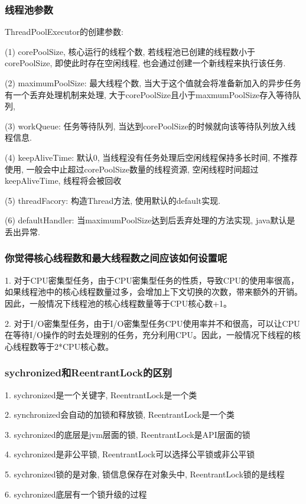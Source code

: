 \subsubsection{线程池参数}
ThreadPoolExecutor的创建参数: \par
(1) corePoolSize, 核心运行的线程个数, 若线程池已创建的线程数小于corePoolSize, 即使此时存在空闲线程, 也会通过创建一个新线程来执行该任务. \par
(2) maximumPoolSize: 最大线程个数, 当大于这个值就会将准备新加入的异步任务有一个丢弃处理机制来处理, 大于corePoolSize且小于maxmumPoolSize存入等待队列,\par
(3) workQueue: 任务等待队列, 当达到corePoolSize的时候就向该等待队列放入线程信息.\par
(4) keepAliveTime: 默认0, 当线程没有任务处理后空闲线程保持多长时间, 不推荐使用, 一般会中止超过corePoolSize数量的线程资源, 空闲线程时间超过keepAliveTime, 线程将会被回收 \par
(5) threadFacory: 构造Thread方法, 使用默认的default实现. \par
(6) defaultHandler: 当maximumPoolSize达到后丢弃处理的方法实现, java默认是丢出异常. \par

\subsubsection{你觉得核心线程数和最大线程数之间应该如何设置呢}
1. 对于CPU密集型任务，由于CPU密集型任务的性质，导致CPU的使用率很高，如果线程池中的核心线程数量过多，会增加上下文切换的次数，带来额外的开销。因此，一般情况下线程池的核心线程数量等于CPU核心数+1。

2. 对于I/O密集型任务，由于I/O密集型任务CPU使用率并不和很高，可以让CPU在等待I/O操作的时去处理别的任务，充分利用CPU。因此，一般情况下线程的核心线程数等于2*CPU核心数。


\subsubsection{sychronized和ReentrantLock的区别}
1. sychronized是一个关键字, ReentrantLock是一个类 \par
2. synchronized会自动的加锁和释放锁, ReentrantLock是一个类 \par
3. sychronized的底层是jvm层面的锁, ReentrantLock是API层面的锁 \par
4. sychronized是非公平锁, ReentrantLock可以选择公平锁或非公平锁 \par
5. sychronized锁的是对象, 锁信息保存在对象头中, ReentrantLock锁的是线程 \par
6. sychronized底层有一个锁升级的过程 \par
